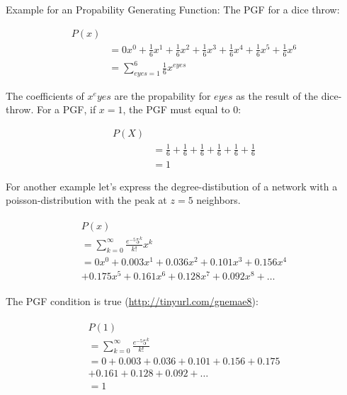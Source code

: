 




Example for an Propability Generating Function: The PGF for a dice throw:

\begin{equation*}
\begin{split}
P(x)\\
&= 0x^0 + \frac{1}{6}x^1 + \frac{1}{6}x^2 + \frac{1}{6}x^3 + \frac{1}{6}x^4 + \frac{1}{6}x^5 + \frac{1}{6}x^6\\
&= \sum_{eyes=1}^{6}\frac{1}{6}x^{eyes}
\end{split}
\end{equation*}

The coefficients of $x^eyes$ are the propability for $eyes$ as the result of the dice-throw. For a PGF, if $x=1$, the PGF must equal to $0$:

\begin{equation*}
\begin{split}
P(X)\\
&= \frac{1}{6} + \frac{1}{6} + \frac{1}{6} + \frac{1}{6} + \frac{1}{6} + \frac{1}{6}\\
&= 1
\end{split}
\end{equation*}

For another example let's express the degree-distibution of a network with a poisson-distribution with the peak at $z = 5$ neighbors.

\begin{multline*}
\begin{split}
P(x)\\
= \sum_{k=0}^{\infty}\frac{e^{-5}5^k}{k!}x^k\\
= 0x^0 + 0.003x^1 + 0.036x^2 + 0.101x^3 + 0.156x^4\\
    + 0.175x^5 + 0.161x^6 + 0.128x^7 + 0.092x^8 + \ldots
\end{split}
\end{multline*}

The PGF condition is true (\url{http://tinyurl.com/gnemae8}):

\begin{multline*}
\begin{split}
P(1)\\
= \sum_{k=0}^{\infty}\frac{e^{-5}5^k}{k!}\\
= 0 + 0.003 + 0.036 + 0.101 + 0.156 + 0.175\\
    + 0.161 + 0.128 + 0.092 + \ldots\\
= 1
\end{split}
\end{multline*}

